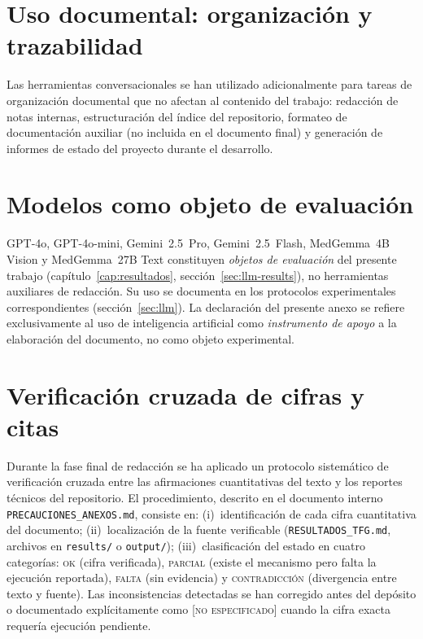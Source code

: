\section{Uso documental: organización y trazabilidad}
\label{sec:anexod-documental}

Las herramientas conversacionales se han utilizado adicionalmente
para tareas de organización documental que no afectan al contenido
del trabajo: redacción de notas internas, estructuración del
índice del repositorio, formateo de documentación auxiliar
(no incluida en el documento final) y generación de informes de
estado del proyecto durante el desarrollo.

\section{Modelos como objeto de evaluación}
\label{sec:anexod-objeto}

GPT-4o, GPT-4o-mini, Gemini~2.5~Pro, Gemini~2.5~Flash,
MedGemma~4B Vision y MedGemma~27B Text constituyen
\emph{objetos de evaluación} del presente trabajo
(capítulo~\ref{cap:resultados}, sección~\ref{sec:llm-results}), no
herramientas auxiliares de redacción. Su uso se documenta en los
protocolos experimentales correspondientes
(sección~\ref{sec:llm}). La declaración del presente anexo se refiere
exclusivamente al uso de inteligencia artificial como
\emph{instrumento de apoyo} a la elaboración del documento, no
como objeto experimental.

\section{Verificación cruzada de cifras y citas}
\label{sec:anexod-verificacion}

Durante la fase final de redacción se ha aplicado un protocolo
sistemático de verificación cruzada entre las afirmaciones
cuantitativas del texto y los reportes técnicos del repositorio.
El procedimiento, descrito en el documento interno
\texttt{PRECAUCIONES\_ANEXOS.md}, consiste en: (i)~identificación
de cada cifra cuantitativa del documento;
(ii)~localización de la fuente verificable
(\texttt{RESULTADOS\_TFG.md}, archivos en \texttt{results/} o
\texttt{output/}); (iii)~clasificación del estado en cuatro
categorías: \textsc{ok} (cifra verificada), \textsc{parcial}
(existe el mecanismo pero falta la ejecución reportada),
\textsc{falta} (sin evidencia) y \textsc{contradicción}
(divergencia entre texto y fuente). Las inconsistencias detectadas
se han corregido antes del depósito o documentado explícitamente
como \textsc{[no especificado]} cuando la cifra exacta requería
ejecución pendiente.

